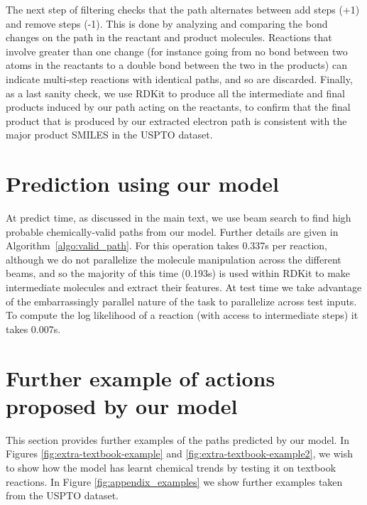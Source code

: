 The next step of filtering checks that the path alternates between add steps (+1) and remove steps (-1). 
This is done by analyzing and comparing the bond changes on the path in the reactant and product molecules. 
Reactions that involve greater than one change (for instance going from no bond between two atoms in the reactants to a double bond between the two in the products) can indicate multi-step 
reactions with identical paths, and so are discarded.
Finally, as a last sanity check, we use RDKit to produce all the intermediate and final products induced by our path acting on the reactants,
to confirm that the final product that is produced by our extracted electron path is consistent with the major product SMILES in the USPTO dataset.

\section{Prediction using our model}

At predict time, as discussed in the main text, we use beam search to find high probable chemically-valid paths from our model. Further details are given in Algorithm~\ref{algo:valid_path}. 
For \ourModel this operation takes 0.337s per reaction, although we do not parallelize the molecule manipulation across the different beams, and so the majority of this time (0.193s) is used within RDKit to make intermediate molecules and extract their features.
At test time we take advantage of the embarrassingly parallel nature of the task to parallelize across test inputs. 
To compute the log likelihood of a reaction (with access to intermediate steps) it takes \ourModel 0.007s.




\FloatBarrier
\section{Further example of actions proposed by our model}

This section provides further examples of the paths predicted by our model.
In Figures  \ref{fig:extra-textbook-example} and \ref{fig:extra-textbook-example2}, we wish to show how the model has learnt chemical trends by testing it on textbook reactions.
In Figure \ref{fig:appendix_examples} we show further examples taken from the USPTO dataset.


